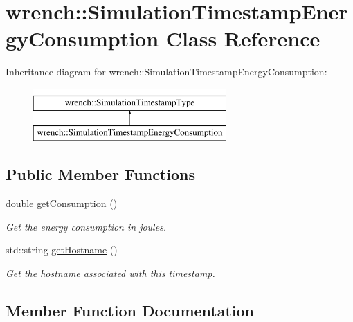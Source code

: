 \hypertarget{classwrench_1_1_simulation_timestamp_energy_consumption}{}\section{wrench\+:\+:Simulation\+Timestamp\+Energy\+Consumption Class Reference}
\label{classwrench_1_1_simulation_timestamp_energy_consumption}
Inheritance diagram for wrench\+:\+:Simulation\+Timestamp\+Energy\+Consumption\+:\begin{figure}[H]
\begin{center}
\leavevmode
\includegraphics[height=2.000000cm]{classwrench_1_1_simulation_timestamp_energy_consumption}
\end{center}
\end{figure}
\subsection*{Public Member Functions}
\begin{DoxyCompactItemize}
\item 
double \hyperlink{classwrench_1_1_simulation_timestamp_energy_consumption_a454ab3147bfd09aa4c5f90a631e75569}{get\+Consumption} ()
\begin{DoxyCompactList}\small\item\em Get the energy consumption in joules. \end{DoxyCompactList}\item 
std\+::string \hyperlink{classwrench_1_1_simulation_timestamp_energy_consumption_a605050f7adac67374dc7c0dbf419220c}{get\+Hostname} ()
\begin{DoxyCompactList}\small\item\em Get the hostname associated with this timestamp. \end{DoxyCompactList}\end{DoxyCompactItemize}


\subsection{Member Function Documentation}
\mbox{\label{classwrench_1_1_simulation_timestamp_energy_consumption_a454ab3147bfd09aa4c5f90a631e75569}} 
